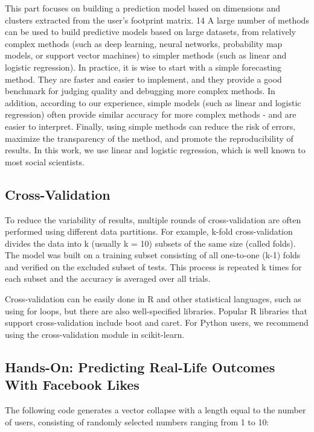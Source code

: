 This part focuses on building a prediction model based on 
dimensions and clusters extracted from the user's footprint matrix.
 14 A large number of methods can be used to build predictive 
models based on large datasets, from relatively complex methods 
(such as deep learning, neural networks, probability map models, or
 support vector machines) to simpler methods (such as linear and 
logistic regression). In practice, it is wise to start with a 
simple forecasting method. They are faster and easier to implement,
 and they provide a good benchmark for judging quality and 
debugging more complex methods. In addition, according to our 
experience, simple models (such as linear and logistic regression)
 often provide similar accuracy for more complex methods - and are
 easier to interpret. Finally, using simple methods can reduce the
 risk of errors, maximize the transparency of the method, and 
promote the reproducibility of results. In this work, we use linear
 and logistic regression, which is well known to most social 
scientists.

\subsection{Cross-Validation}

To reduce the variability of results, multiple rounds of 
cross-validation are often performed using different data 
partitions. For example, k-fold cross-validation divides the data 
into k (usually k = 10) subsets of the same size (called folds). 
The model was built on a training subset consisting of all 
one-to-one (k-1) folds and verified on the excluded subset of 
tests. This process is repeated k times for each subset and the 
accuracy is averaged over all trials.

Cross-validation can be easily done in R and other statistical 
languages, such as using for loops, but there are also 
well-specified libraries. Popular R libraries that support 
cross-validation include boot and caret. For Python users, we 
recommend using the cross-validation module in scikit-learn.

\subsection{Hands-On: Predicting Real-Life Outcomes With
Facebook Likes}

The following code generates a vector collapse with a length equal
 to the number of users, consisting of randomly selected numbers 
ranging from 1 to 10:

